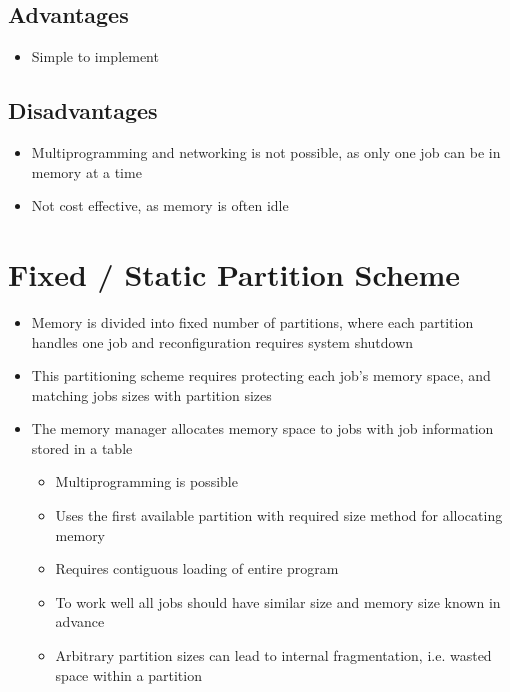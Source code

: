 \documentclass[12pt letter]{report}
\begin{document}
\subsection{Advantages}
\begin{itemize}
  \item Simple to implement
\end{itemize}

\subsection{Disadvantages}
\begin{itemize}
  \item Multiprogramming and networking is not possible, as only one job can be in memory at a time
  \item Not cost effective, as memory is often idle
\end{itemize}

\section{Fixed / Static Partition Scheme}

\begin{itemize}
  \item Memory is divided into fixed number of partitions, where each partition handles one job and reconfiguration requires system shutdown
  \item This partitioning scheme requires protecting each job's memory space, and matching jobs sizes with partition sizes
  \item The memory manager allocates memory space to jobs with job information stored in a table
        \begin{itemize}
          \item Multiprogramming is possible
          \item  Uses the first available partition with required size method for allocating memory
          \item Requires contiguous loading of entire program
          \item To work well all jobs should have similar size and memory size known in advance
          \item Arbitrary partition sizes can lead to internal fragmentation, i.e. wasted space within a partition
        \end{itemize}
\end{itemize}

\end{document}
